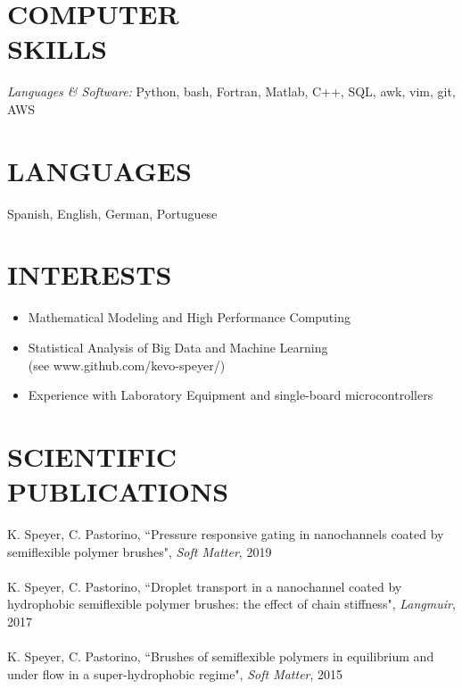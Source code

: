 \documentclass[margin]{res}
\begin{document}
\begin{resume}
 
\section{COMPUTER \\ SKILLS} {\sl Languages \& Software:} Python, bash, 
		Fortran, Matlab, C++, SQL, awk, vim, git, AWS 
               
 
\section{LANGUAGES}  Spanish, English, German, Portuguese 

\section{INTERESTS}        
       \begin{itemize}  \itemsep -2pt %
        \item            Mathematical Modeling and High Performance Computing 
	\item    Statistical Analysis of Big Data and Machine Learning \\ 
	    (see www.github.com/kevo-speyer/) 
    	\item    Experience with Laboratory Equipment and single-board 
	    microcontrollers 
       \end{itemize}
 
\section{SCIENTIFIC \\ PUBLICATIONS}            
		       K. Speyer, C. Pastorino, ``Pressure responsive gating in 
		nanochannels coated by semiflexible polymer brushes", 
		       {\sl Soft Matter}, 2019 \\ \\
		       K. Speyer, C. Pastorino, ``Droplet transport in a 
		nanochannel coated by hydrophobic semiflexible polymer 
		       brushes: the effect of chain stiffness", {\sl Langmuir},
		       2017 \\ \\
	K. Speyer, C. Pastorino, ``Brushes of semiflexible polymers in 
		equilibrium and under flow in a super-hydrophobic regime", 
		       {\sl Soft Matter}, 2015 


\end{resume}
\end{document}

